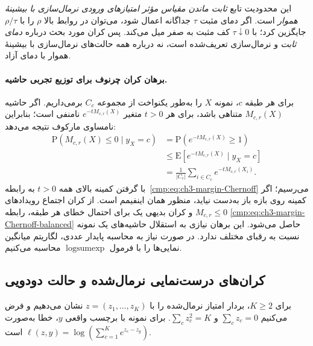 این محدودیت تابع
\emph{ثابت ماندن مقیاس مؤثر
امتیازهای ورودی نرمال‌سازی با بیشینهٔ هموار}
است. اگر دمای مثبت
$\tau$ جداگانه اعمال شود،
می‌توان در روابط بالا
$\rho$ را با $\rho/\tau$
جایگزین کرد؛ با
$\tau\downarrow0$ کف مثبت
به صفر میل می‌کند.
پس کران مورد بحث
درباره \emph{دمای ثابت}
و نرمال‌سازی تعریف‌شده
است، نه درباره همه
حالت‌های نرمال‌سازی با بیشینهٔ هموار با
دمای آزاد.



\paragraph{برهان کران چرنوف برای توزیع تجربی حاشیه.}
برای هر طبقه $c$،
نمونه $X$ را به‌طور یکنواخت
از مجموعه $C_c$ برمی‌داریم.
اگر حاشیه $M_{c,r}(X)$
متناهی باشد، برای هر $t>0$
متغیر $e^{-tM_{c,r}(X)}$
نامنفی است؛ بنابراین
نامساوی مارکوف نتیجه می‌دهد:
\begin{equation}\label{eq:app-ch3-margin-Chernoff-proof}
\begin{aligned}
\mathrm P(M_{c,r}(X)\le0\mid y_X=c)
&=\mathrm P(e^{-tM_{c,r}(X)}\ge1)\\
&\le\mathrm E[e^{-tM_{c,r}(X)}\mid y_X=c]\\
&=\frac1{|C_c|}
\sum_{i\in C_c}e^{-tM_{c,r}(X_i)}.
\end{aligned}
\end{equation}
با گرفتن کمینه بالای همه $t>0$
به رابطه~\eqref{cmp:eq:ch3-margin-Chernoff}
می‌رسیم؛ اگر کمینه روی
بازه باز به‌دست نیاید،
منظور همان اینفیمم است.
از کران اجتماع رویدادهای
$M_{c,r}\le0$ و کران
بدیهی یک برای احتمال
خطای هر طبقه، رابطه
\eqref{cmp:eq:ch3-margin-Chernoff-balanced}
حاصل می‌شود. این برهان
نیازی به استقلال حاشیه‌های
یک نمونه نسبت به
رقبای مختلف ندارد.
در صورت نیاز به محاسبه
پایدار عددی، لگاریتم
میانگین نمایی‌ها را
با فرمول
$\operatorname{logsumexp}$
محاسبه می‌کنیم.


\subsection{کران‌های درست‌نمایی نرمال‌شده و حالت دودویی}
\label{app:ch3-normalized-NLL-bound}
برای $K\ge2$، بردار امتیاز نرمال‌شده را با $z=(z_1,\ldots,z_K)$ نشان می‌دهیم و فرض می‌کنیم $\sum_cz_c=0$ و $\sum_cz_c^2=K$. برای نمونه با برچسب واقعی $y$، خطا به‌صورت
$\ell(z,y)=\log(\sum_{c=1}^{K}e^{z_c-z_y})$ است.

